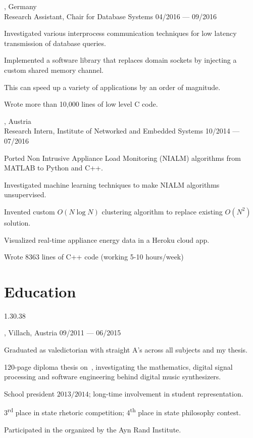 \begin{entry}
	{, Germany}
	{\\Research Assistant, Chair for Database Systems}
	{04/2016 --- 09/2016}
  \item Investigated various interprocess communication techniques for low latency transmission of database queries.
  \item Implemented a software library that replaces domain sockets by injecting a custom shared memory channel.
  \item This can speed up a variety of applications by an order of magnitude.
  \item Wrote more than 10,000 lines of low level C code.
\end{entry}

\begin{entry}
	{, Austria}
	{\\Research Intern, Institute of Networked and Embedded Systems}
	{10/2014 --- 07/2016}
	\item Ported Non Intrusive Appliance Load Monitoring (NIALM) algorithms from MATLAB to Python and C++.
  \item Investigated machine learning techniques to make NIALM
  algorithms unsupervised.
	\item Invented custom $O(N \log N)$ clustering algorithm to replace existing $O(N^2)$ solution.
  \item Visualized real-time appliance energy data in a Heroku cloud app.
	\item Wrote 8363 lines of C++ code (working 5-10 hours/week)
\end{entry}

\vspace{-2mm}
\section{Education}{1.3}{0.38}
\begin{entry}
	{, Villach, Austria}{}
	{09/2011 --- 06/2015}
	\item Graduated as valedictorian with straight A's across all subjects and my thesis.
  \item 120-page diploma thesis on  \,, investigating the mathematics, digital signal processing and software engineering behind digital music synthesizers.
	\item School president $2013/2014$; long-time involvement in student representation.
  \item 3\textsuperscript{rd} place in state rhetoric competition; 4\textsuperscript{th} place in state philosophy contest.
  \item Participated in the  organized by the Ayn Rand Institute.
\end{entry}

